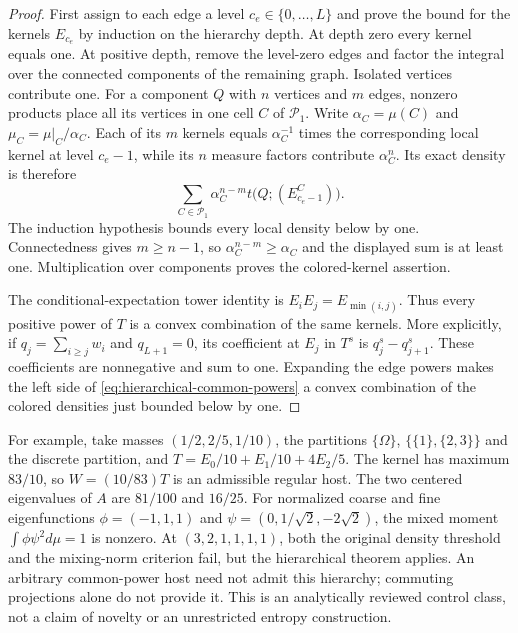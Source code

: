 \begin{proof}
First assign to each edge a level $c_e\in\{0,\ldots,L\}$ and prove the
bound for the kernels $E_{c_e}$ by induction on the hierarchy depth.
At depth zero every kernel equals one.  At positive depth, remove the
level-zero edges and factor the integral over the connected components
of the remaining graph.  Isolated vertices contribute one.
For a component $Q$ with $n$ vertices and $m$ edges, nonzero products
place all its vertices in one cell $C$ of $\mathcal P_1$.  Write
$\alpha_C=\mu(C)$ and $\mu_C=\mu|_C/\alpha_C$.
Each of its $m$ kernels equals $\alpha_C^{-1}$ times the corresponding
local kernel at level $c_e-1$, while its $n$ measure factors contribute
$\alpha_C^n$.  Its exact density is therefore
\[
 \sum_{C\in\mathcal P_1}\alpha_C^{n-m}
       t\bigl(Q;(E_{c_e-1}^{C})\bigr).
\]
The induction hypothesis bounds every local density below by one.
Connectedness gives $m\geq n-1$, so
$\alpha_C^{n-m}\geq\alpha_C$ and the displayed sum is at least one.
Multiplication over components proves the colored-kernel assertion.

The conditional-expectation tower identity is
$E_iE_j=E_{\min(i,j)}$.  Thus every positive power of $T$ is a convex
combination of the same kernels.  More explicitly, if
$q_j=\sum_{i\geq j}w_i$ and $q_{L+1}=0$, its coefficient at $E_j$ in
$T^s$ is $q_j^s-q_{j+1}^s$.  These coefficients are nonnegative and sum
to one.  Expanding the edge powers makes the left side of
\eqref{eq:hierarchical-common-powers} a convex combination of the
colored densities just bounded below by one.
\end{proof}

For example, take masses $(1/2,2/5,1/10)$, the partitions
$\{\Omega\}$, $\{\{1\},\{2,3\}\}$ and the discrete partition, and
$T=E_0/10+E_1/10+4E_2/5$.  The kernel has maximum $83/10$, so
$W=(10/83)T$ is an admissible regular host.  The two centered eigenvalues
of $A$ are $81/100$ and $16/25$.  For normalized coarse and fine
eigenfunctions $\phi=(-1,1,1)$ and
$\psi=(0,1/\sqrt2,-2\sqrt2)$, the mixed moment
$\int\phi\psi^2d\mu=1$ is nonzero.
At $(3,2,1,1,1,1)$, both the original density threshold and the
mixing-norm criterion fail, but the hierarchical theorem applies.
An arbitrary common-power host need not admit this hierarchy;
commuting projections alone do not provide it.  This is an analytically
reviewed control class, not a claim of novelty or an unrestricted entropy
construction.

